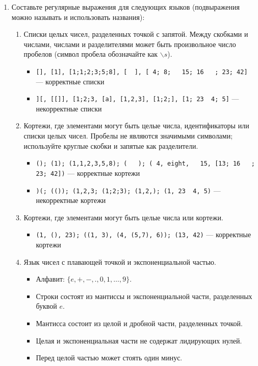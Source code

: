 \documentclass[12pt]{article}
\begin{document}
\begin{enumerate}
  \item
  { Составьте регулярные выражения для следующих языков (подвыражения можно называть и использовать названия): 
    \begin{enumerate}
      \item
      { Списки целых чисел, разделенных точкой с запятой. Между скобками и числами, числами и разделителями может быть произвольное число пробелов (символ пробела обозначайте как $\backslash s$). 
        \begin{itemize} 
          \item \verb![], [1], [1;1;2;3;5;8], [  ], [ 4; 8;   15; 16   ; 23; 42]! --- корректные списки
          \item \verb!][, [[]], [1;2;3, [a], [1,2,3], [1;2;], [1; 23  4; 5]! --- некорректные списки
        \end{itemize}
      }
      \item
      { Кортежи, где элементами могут быть целые числа, идентификаторы или списки целых чисел. Пробелы не являются значимыми символами; используйте круглые скобки и запятые как разделители. 
        \begin{itemize} 
          \item \verb!(); (1); (1,1,2,3,5,8); (   ); ( 4, eight,   15, [13; 16   ; 23; 42])! --- корректные кортежи
          \item \verb!)(; (()); (1,2,3; (1;2;3); (1,2,); (1, 23  4, 5)! --- некорректные кортежи
        \end{itemize}
      }
      \item
      { Кортежи, где элементами могут быть целые числа или кортежи. 
      \begin{itemize} 
          \item \verb!(1, (), 23); ((1, 3), (4, (5,7), 6)); (13, 42)! --- корректные кортежи
      \end{itemize}
      }
      \item Язык чисел с плавающей точкой и экспоненциальной частью.
        \begin{itemize}
            \item Алфавит: $\{e, +, -, ., 0,1,\dots,9\}$.
            \item Строки состоят из мантиссы и экспоненциальной части, разделенных буквой $e$.
            \item Мантисса состоит из целой и дробной части, разделенных точкой.
            \item Целая и экспоненциальная части не содержат лидирующих нулей.
            \item Перед целой частью может стоять один минус. 

\end{itemize}
\end{enumerate}}
\end{enumerate}
\end{document}

